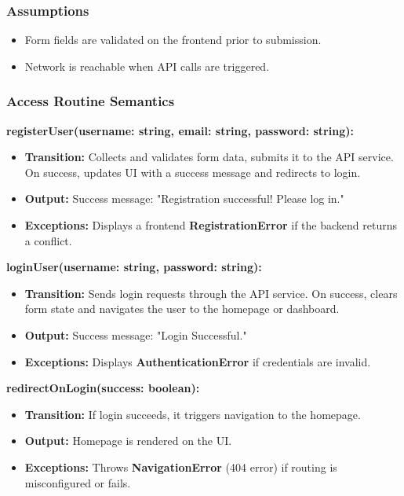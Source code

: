 \documentclass[12pt, titlepage]{article}
\begin{document}
\subsubsection{Assumptions}
\begin{itemize}
    \item Form fields are validated on the frontend prior to submission.
    \item Network is reachable when API calls are triggered.
\end{itemize}

\subsubsection{Access Routine Semantics}

\textbf{registerUser(username: string, email: string, password: string):}
\begin{itemize}
    \item \textbf{Transition:} Collects and validates form data, submits it to the API service. On success, updates UI with a success message and redirects to login.
    \item \textbf{Output:} Success message: "Registration successful! Please log in."
    \item \textbf{Exceptions:} Displays a frontend \textbf{RegistrationError} if the backend returns a conflict.
\end{itemize}

\textbf{loginUser(username: string, password: string):}
\begin{itemize}
    \item \textbf{Transition:} Sends login requests through the API service. On success, clears form state and navigates the user to the homepage or dashboard.
    \item \textbf{Output:} Success message: "Login Successful."
    \item \textbf{Exceptions:} Displays \textbf{AuthenticationError} if credentials are invalid.
\end{itemize}

\textbf{redirectOnLogin(success: boolean):}
\begin{itemize}
    \item \textbf{Transition:} If login succeeds, it triggers navigation to the homepage.
    \item \textbf{Output:} Homepage is rendered on the UI.
    \item \textbf{Exceptions:} Throws \textbf{NavigationError} (404 error) if routing is misconfigured or fails.
\end{itemize}
\end{document}
